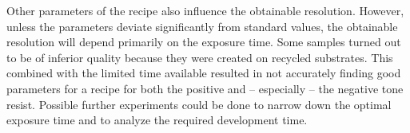 Other parameters of the recipe also influence the obtainable resolution. However, unless the parameters deviate significantly from standard values, the obtainable resolution will depend primarily on the exposure time. Some samples turned out to be of inferior quality because they were created on recycled substrates. This combined with the limited time available resulted in not accurately finding good parameters for a recipe for both the positive and -- especially -- the negative tone resist. Possible further experiments could be done to narrow down the optimal exposure time and to analyze the required development time.

